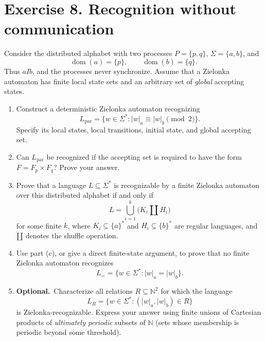 \documentclass[10pt,a4paper]{article}
\newcommand{\dom}{\operatorname{dom}}
\newcommand{\extra}{\textbf{Optional.}\ }
\begin{document}
\section*{Exercise 8. Recognition without communication}
Consider the distributed alphabet with two processes $P=\{p,q\}$,
$\Sigma=\{a,b\}$, and
\[
    \dom(a)=\{p\},\qquad \dom(b)=\{q\}.
\]
Thus $aIb$, and the processes never synchronize. Assume that a
Zielonka automaton has finite local state sets and an arbitrary set
of \emph{global} accepting states.
\begin{enumerate}
\item Construct a deterministic Zielonka automaton recognizing
      \[
          L_{\mathrm{par}}=
          \{w\in\Sigma^*: |w|_a\equiv |w|_b\pmod 2\}.
      \]
      Specify its local states, local transitions, initial state,
      and global accepting set.
\item Can $L_{\mathrm{par}}$ be recognized if the accepting set
      is required to have the form $F=F_p\times F_q$?
      Prove your answer.
\item Prove that a language $L\subseteq\Sigma^*$ is recognizable
      by a finite Zielonka automaton over this distributed alphabet
      if and only if
      \[
          L=\bigcup_{i=1}^{k}\bigl(K_i\mathbin{\amalg} H_i\bigr)
      \]
      for some finite $k$, where $K_i\subseteq\{a\}^*$ and
      $H_i\subseteq\{b\}^*$ are regular languages, and $\mathbin{\amalg}$
      denotes the shuffle operation.
\item Use part (c), or give a direct finite-state argument, to prove
      that no finite Zielonka automaton recognizes
      \[
          L_{=}=\{w\in\Sigma^*:|w|_a=|w|_b\}.
      \]
\item \extra Characterize all relations $R\subseteq\mathbb N^2$
      for which the language
      \[
          L_R=\{w\in\Sigma^*:(|w|_a,|w|_b)\in R\}
      \]
      is Zielonka-recognizable. Express your answer using finite
      unions of Cartesian products of \emph{ultimately periodic}
      subsets of $\mathbb N$ (sets whose membership is periodic
      beyond some threshold).
\end{enumerate}
\end{document}
